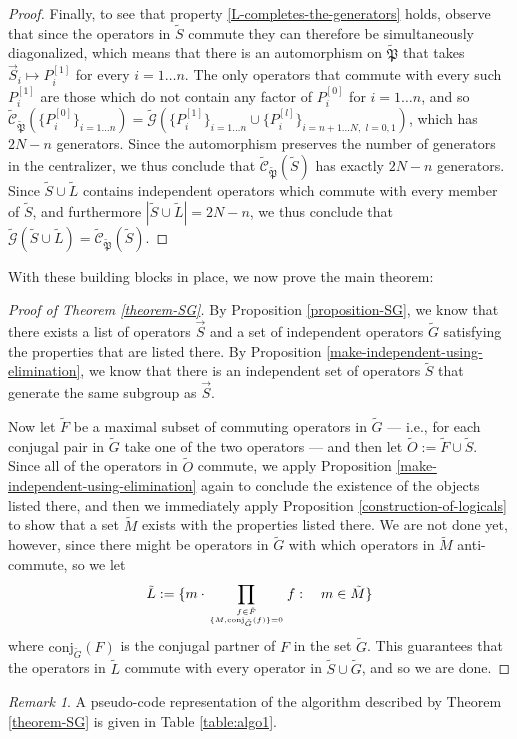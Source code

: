 \documentclass[12pt]{amsbook}
\theoremstyle{plain}
\theoremstyle{definition}
\theoremstyle{remark}
\newtheorem{remark}{Remark}
\newcommand{\lst}{\vec}
\newcommand{\set}{\tilde}
\newcommand{\genfun}{\tilde{\mathcal{G}}}
\newcommand{\pauligroup}{{\set{\mathfrak{P}}}}
\newcommand{\centralizer}{\set{\mathcal{C}}}
\newcommand{\paren}[1]{\left(#1\right)}
\begin{document}
\begin{proof}
Finally, to see that property \ref{L-completes-the-generators} holds, observe that since the operators in $\set S$ commute they can therefore be simultaneously diagonalized, which means that there is an automorphism on $\pauligroup$ that takes $\lst S_i\mapsto P_i^{[1]}$ for every $i=1 \dots n$.  The only operators that commute with every such $P_i^{[1]}$ are those which do not contain any factor of $P_i^{[0]}$ for $i=1 \dots n$, and so $\centralizer_\pauligroup\paren{\{P_i^{[0]}\}_{i=1\dots n}} = \genfun\paren{\{P_i^{[1]}\}_{i=1 \dots n}\cup \{P_i^{[l]}\}_{i=n+1 \dots N, \,\, l=0,1}}$, which has $2N-n$ generators.  Since the automorphism preserves the number of generators in the centralizer, we thus conclude that $\centralizer_\pauligroup(\set S)$ has exactly $2N-n$ generators.  Since $\set S\cup\set L$ contains independent operators which commute with every member of $\set S$, and furthermore $|\set S\cup\set L|=2N-n$, we thus conclude that $\genfun\paren{\set S\cup\set L}=\centralizer_\pauligroup(\set S)$.
\end{proof}
With these building blocks in place, we now prove the main theorem:

\begin{proof}[Proof of Theorem \ref{theorem-SG}]
By Proposition \ref{proposition-SG}, we know that there exists a list of operators $\lst S$ and a set of independent operators $\set G$ satisfying the properties that are listed there.  By Proposition \ref{make-independent-using-elimination}, we know that there is an independent set of operators $\set S$ that generate the same subgroup as $\lst S$.  

Now let $\set F$ be a maximal subset of commuting operators in $\set G$ --- i.e., for each conjugal pair in $\set G$ take one of the two operators --- and then let $\set O := \set F \cup \set S$.  Since all of the operators in $\set O$ commute, we apply Proposition \ref{make-independent-using-elimination} again to conclude the existence of the objects listed there, and then we immediately apply Proposition \ref{construction-of-logicals} to show that a set $\set M$ exists with the properties listed there.  We are not done yet, however, since there might be operators in $\set G$ with which operators in $\set M$ anti-commute, so we let
$$\set L := \{m\cdot\prod_{f\in \set F\atop \{M,\text{conj}_{\set G}(f)\}=0} f :\quad m \in\set M\}$$
where $\text{conj}_{\set G}(F)$ is the conjugal partner of $F$ in the set $\set G$.  This guarantees that the operators in $\set L$ commute with every operator in $\set S\cup\set G$, and so we are done.
\end{proof}
\begin{remark}
A pseudo-code representation of the algorithm described by Theorem \ref{theorem-SG} is given in Table \ref{table:algo1}.
\end{remark}
\end{document}

